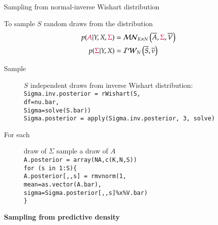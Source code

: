 \documentclass[notes,blackandwhite,mathsans,usenames,dvipsnames]{beamer}
\begin{document}
\begin{frame}{Sampling from normal-inverse Wishart distribution}

{\color{mcxs2}To sample} $S$ {\color{mcxs2}random draws from the distribution}
\begin{align*} 
p({\color{purple}A}|Y,X,{\color{purple}\Sigma}) &= \mathcal{MN}_{K\times N}\left( \overline{A},{\color{purple}\Sigma},\overline{V} \right)\\
p({\color{purple}\Sigma}|Y,X) &= \mathcal{IW}_N\left( \overline{S}, \overline{\nu} \right)
\end{align*} 

\begin{description}
\item[Sample] $S$ {\color{mcxs2}independent draws from inverse Wishart distribution:}\\ \small
\texttt{Sigma.inv.posterior = rWishart(S,\\ \hspace{1cm} df=nu.bar,\\ \hspace{1cm} Sigma=solve(S.bar))\\
Sigma.posterior = apply(Sigma.inv.posterior, 3, solve)}

\bigskip\normalsize\item[For each] {\color{mcxs2}draw of} $\Sigma$ {\color{mcxs2}sample a draw of} $A$\\ \small
\texttt{A.posterior = array(NA,c(K,N,S))\\
for (s in 1:S)\{\\
\hspace{1cm}A.posterior[,,s] = rmvnorm(1,\\
\hspace{1.5cm}mean=as.vector(A.bar),\\
\hspace{1.5cm}sigma=Sigma.posterior[,,s]\%x\%V.bar)\\
\hspace{1cm}\} }
\end{description}

\end{frame}



{
\begin{frame}

\begin{adjustwidth}{-0.5cm}{0cm}
\vspace{8.3cm}\Large
\textbf{{\color{mcxs1}Sampling from} {\color{mcxs2}predictive density}}
\end{adjustwidth}

\end{frame}
}
\end{document}
